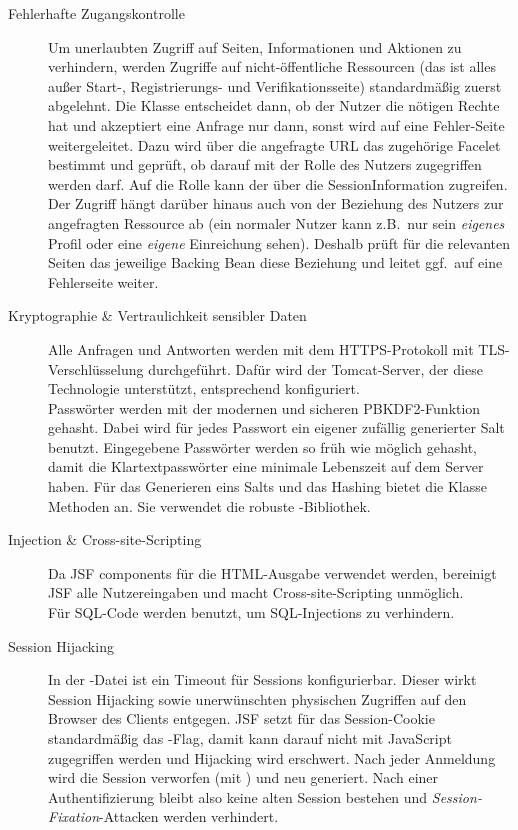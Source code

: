 \begin{description}
\item[Fehlerhafte Zugangskontrolle] 
Um unerlaubten Zugriff auf Seiten, Informationen und Aktionen zu verhindern, werden Zugriffe auf nicht-öffentliche Ressourcen (das ist alles außer Start-, Registrierungs- und Verifikationsseite) standardmäßig zuerst abgelehnt.
Die Klasse  entscheidet dann, ob der Nutzer die nötigen Rechte hat und akzeptiert eine Anfrage nur dann, sonst wird auf eine Fehler-Seite weitergeleitet.
Dazu wird über die angefragte URL das zugehörige Facelet bestimmt und geprüft, ob darauf mit der Rolle des Nutzers zugegriffen werden darf.
Auf die Rolle kann der  über die SessionInformation zugreifen.
Der Zugriff hängt darüber hinaus auch von der Beziehung des Nutzers zur angefragten Ressource ab (ein normaler Nutzer kann z.B.\ nur sein \emph{eigenes} Profil oder eine \emph{eigene} Einreichung sehen).
Deshalb prüft für die relevanten Seiten das jeweilige Backing Bean diese Beziehung und leitet ggf.\ auf eine Fehlerseite weiter.

\item[Kryptographie \& Vertraulichkeit sensibler Daten]
Alle Anfragen und Antworten werden mit dem HTTPS-Protokoll mit TLS-Verschlüsselung durchgeführt.
Dafür wird der Tomcat-Server, der diese Technologie unterstützt, entsprechend konfiguriert.
\\
Passwörter werden mit der modernen und sicheren PBKDF2-Funktion gehasht. Dabei wird für jedes Passwort ein eigener zufällig generierter Salt benutzt.
Eingegebene Passwörter werden so früh wie möglich gehasht, damit die Klartextpasswörter eine minimale Lebenszeit auf dem Server haben.
Für das Generieren eins Salts und das Hashing bietet die Klasse  Methoden an.
Sie verwendet die robuste -Bibliothek.

\item[Injection \& Cross-site-Scripting]
Da JSF components für die HTML-Ausgabe verwendet werden, bereinigt JSF alle Nutzereingaben und macht Cross-site-Scripting unmöglich.
\\
Für SQL-Code werden  benutzt, um SQL-Injections zu verhindern.

\item[Session Hijacking]
In der -Datei ist ein Timeout für Sessions konfigurierbar.
Dieser wirkt Session Hijacking sowie unerwünschten physischen Zugriffen auf den Browser des Clients entgegen.
JSF setzt für das Session-Cookie standardmäßig das -Flag, damit kann darauf nicht mit JavaScript zugegriffen werden und Hijacking wird erschwert.
Nach jeder Anmeldung wird die Session verworfen (mit ) und neu generiert.
Nach einer Authentifizierung bleibt also keine alten Session bestehen und \emph{Session-Fixation}-Attacken werden verhindert.
\end{description}

